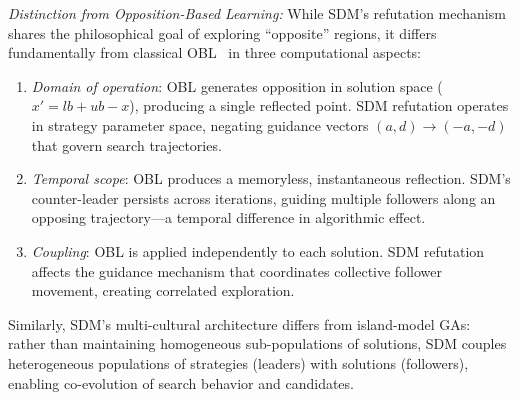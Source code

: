 \documentclass[11pt]{article}
\begin{document}
\textit{Distinction from Opposition-Based Learning:} While SDM's refutation mechanism shares the philosophical goal of exploring ``opposite'' regions, it differs fundamentally from classical OBL~\citep{tizhoosh2005opposition} in three computational aspects:
\begin{enumerate}
    \item \textit{Domain of operation}: OBL generates opposition in solution space ($x' = lb + ub - x$), producing a single reflected point. SDM refutation operates in strategy parameter space, negating guidance vectors $(a, d) \to (-a, -d)$ that govern search trajectories.
    \item \textit{Temporal scope}: OBL produces a memoryless, instantaneous reflection. SDM's counter-leader persists across iterations, guiding multiple followers along an opposing trajectory---a temporal difference in algorithmic effect.
    \item \textit{Coupling}: OBL is applied independently to each solution. SDM refutation affects the guidance mechanism that coordinates collective follower movement, creating correlated exploration.
\end{enumerate}
Similarly, SDM's multi-cultural architecture differs from island-model GAs: rather than maintaining homogeneous sub-populations of solutions, SDM couples heterogeneous populations of strategies (leaders) with solutions (followers), enabling co-evolution of search behavior and candidates.
\end{document}
